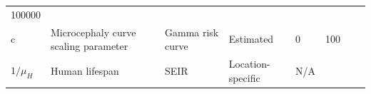 \documentclass[10pt,letterpaper]{article}
\begin{document}
\begin{longtable}[]{@{}llllllll@{}}
\begin{minipage}[t]{0.04\columnwidth}
100000\strut
\end{minipage} & \begin{minipage}[t]{0.14\columnwidth}\raggedright\strut
\strut
\end{minipage} & \begin{minipage}[t]{0.26\columnwidth}\raggedright\strut
\strut
\end{minipage}\tabularnewline
\begin{minipage}[t]{0.04\columnwidth}\raggedright\strut
c\strut
\end{minipage} & \begin{minipage}[t]{0.17\columnwidth}\raggedright\strut
Microcephaly curve scaling parameter\strut
\end{minipage} & \begin{minipage}[t]{0.05\columnwidth}\raggedright\strut
Gamma risk curve\strut
\end{minipage} & \begin{minipage}[t]{0.05\columnwidth}\raggedright\strut
Estimated\strut
\end{minipage} & \begin{minipage}[t]{0.04\columnwidth}\raggedright\strut
0\strut
\end{minipage} & \begin{minipage}[t]{0.04\columnwidth}\raggedright\strut
100\strut
\end{minipage} & \begin{minipage}[t]{0.14\columnwidth}\raggedright\strut
\strut
\end{minipage} & \begin{minipage}[t]{0.26\columnwidth}\raggedright\strut
\strut
\end{minipage}\tabularnewline
\begin{minipage}[t]{0.04\columnwidth}\raggedright\strut
\(1/\mu_H\)\strut
\end{minipage} & \begin{minipage}[t]{0.17\columnwidth}\raggedright\strut
Human lifespan\strut
\end{minipage} & \begin{minipage}[t]{0.05\columnwidth}\raggedright\strut
SEIR\strut
\end{minipage} & \begin{minipage}[t]{0.05\columnwidth}\raggedright\strut
Location-specific\strut
\end{minipage} & \begin{minipage}[t]{0.04\columnwidth}\raggedright\strut
N/A\strut
\end{minipage} & \begin{minipage}[t]{0.04\columnwidth}\raggedright\strut

\end{minipage}
\end{longtable}
\end{document}
